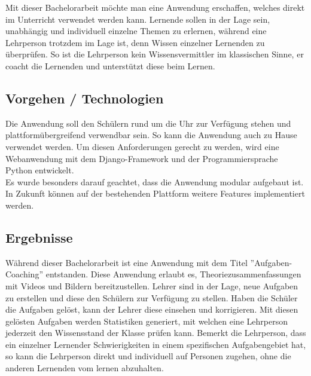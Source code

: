 Mit dieser Bachelorarbeit möchte man eine Anwendung erschaffen, welches direkt im Unterricht verwendet werden kann. Lernende sollen in der Lage sein, unabhängig und individuell einzelne Themen zu erlernen, während eine Lehrperson trotzdem im Lage ist, denn Wissen einzelner Lernenden zu überprüfen. So ist die Lehrperson kein Wissensvermittler im klassischen Sinne, er coacht die Lernenden und unterstützt diese beim Lernen.



\subsection{Vorgehen / Technologien}
Die Anwendung soll den Schülern rund um die Uhr zur Verfügung stehen und plattformübergreifend verwendbar sein. So kann die Anwendung auch zu Hause verwendet werden. Um diesen Anforderungen gerecht zu werden, wird eine Webanwendung mit dem Django-Framework und der Programmiersprache Python entwickelt. \\
Es wurde besonders darauf geachtet, dass die Anwendung modular aufgebaut ist. In Zukunft können auf der bestehenden Plattform weitere Features implementiert werden.

\subsection{Ergebnisse}
Während dieser Bachelorarbeit ist eine Anwendung mit dem Titel ''Aufgaben-Coaching'' entstanden. Diese Anwendung erlaubt es, Theoriezusammenfassungen mit Videos und Bildern bereitzustellen. Lehrer sind in der Lage, neue Aufgaben zu erstellen und diese den Schülern zur Verfügung zu stellen. Haben die Schüler die Aufgaben gelöst, kann der Lehrer diese einsehen und korrigieren. Mit diesen gelösten Aufgaben werden Statistiken generiert, mit welchen eine Lehrperson jederzeit den Wissensstand der Klasse prüfen kann. Bemerkt die Lehrperson, dass ein einzelner Lernender Schwierigkeiten in einem spezifischen Aufgabengebiet hat, so kann die Lehrperson direkt und individuell auf Personen zugehen, ohne die anderen Lernenden vom lernen abzuhalten.

